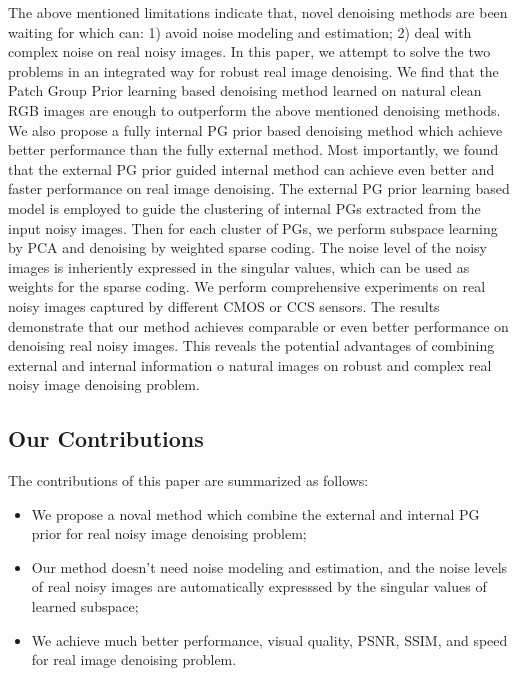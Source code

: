 \documentclass[10pt,twocolumn,letterpaper]{article}
\begin{document}
The above mentioned limitations indicate that, novel denoising methods are been waiting for which can: 1) avoid noise modeling and estimation; 2) deal with complex noise on real noisy images. In this paper, we attempt to solve the two problems in an integrated way for robust real image denoising. We find that the Patch Group Prior learning based denoising \cite{PGPD} method learned on natural clean RGB images are enough to outperform the above mentioned denoising methods. We also propose a fully internal PG prior based denoising method which achieve better performance than the fully external method. Most importantly, we found that the external PG prior guided internal method can achieve even better and faster performance on real image denoising. The external PG prior learning based model is employed to guide the clustering of internal PGs extracted from the input noisy images. Then for each cluster of PGs, we perform subspace learning by PCA and denoising by weighted sparse coding. The noise level of the noisy images is inheriently expressed in the singular values, which can be used as weights for the sparse coding. We perform comprehensive experiments on real noisy images captured by different CMOS or CCS sensors. The results demonstrate that our method achieves comparable or even better performance on denoising real noisy images. This reveals the potential advantages of combining external and internal information o natural images on robust and complex real noisy image denoising problem.


\subsection{Our Contributions}
The contributions of this paper are summarized as follows:
\begin{itemize}
\item We propose a noval method which combine the external and internal PG prior for real noisy image denoising problem;
\item Our method doesn't need noise modeling and estimation, and the noise levels of real noisy images are automatically expresssed by the singular values of learned subspace;
\item We achieve much better performance, visual quality, PSNR, SSIM, and speed for real image denoising problem.
\end{itemize}
\end{document}
